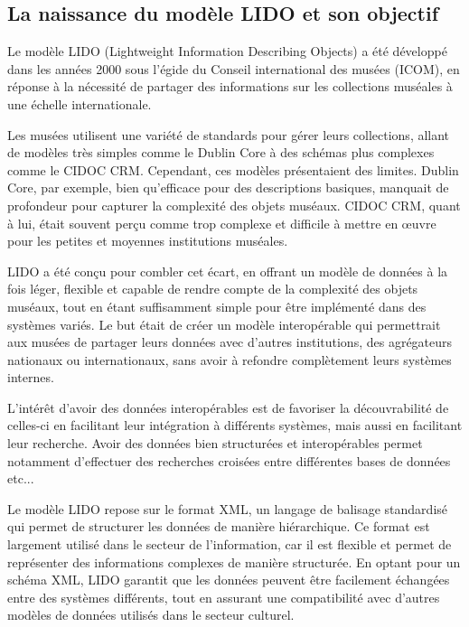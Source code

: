 \subsection{La naissance du modèle LIDO et son objectif}

Le modèle LIDO (Lightweight Information Describing Objects) a été développé dans les années 2000 sous l’égide du Conseil international des musées (ICOM), en réponse à la nécessité  de partager des informations sur les collections muséales à une échelle internationale.\newline

Les musées utilisent une variété de standards pour gérer leurs collections, allant de modèles très simples comme le Dublin Core à des schémas plus complexes comme le CIDOC CRM. Cependant, ces modèles présentaient des limites. Dublin Core, par exemple, bien qu’efficace pour des descriptions basiques, manquait de profondeur pour capturer la complexité des objets muséaux. CIDOC CRM, quant à lui, était souvent perçu comme trop complexe et difficile à mettre en œuvre pour les petites et moyennes institutions muséales.\newline

LIDO a été conçu pour combler cet écart, en offrant un modèle de données à la fois léger, flexible et capable de rendre compte de la complexité des objets muséaux, tout en étant suffisamment simple pour être implémenté dans des systèmes variés. Le but était de créer un modèle interopérable qui permettrait aux musées de partager leurs données avec d'autres institutions, des agrégateurs nationaux ou internationaux, sans avoir à refondre complètement leurs systèmes internes. \newline

L’intérêt d’avoir des données interopérables est de favoriser la découvrabilité de celles-ci en facilitant leur intégration à différents systèmes, mais aussi en facilitant leur recherche. Avoir des données bien structurées et interopérables permet notamment d’effectuer des recherches croisées entre différentes bases de données etc...\newline

Le modèle LIDO repose sur le format XML, un langage de balisage standardisé qui permet de structurer les données de manière hiérarchique. Ce format est largement utilisé dans le secteur de l'information, car il est flexible et permet de représenter des informations complexes de manière structurée. En optant pour un schéma XML, LIDO garantit que les données peuvent être facilement échangées entre des systèmes différents, tout en assurant une compatibilité avec d’autres modèles de données utilisés dans le secteur culturel. \newline

